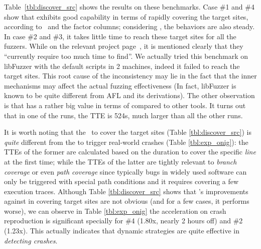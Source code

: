 Table~\ref{tbl:discover_src} shows the results on these benchmarks. 
Case \#1 and \#4 show that \dFOT exhibits good capability in terms of rapidly covering the target sites, according to {\utte}~and the factor columns; considering \alz, the behaviors are also steady. 
In case \#2 and \#3, it takes little time to reach these target sites for all the fuzzers.
While on the relevant project page~\cite{libpng-fts}, it is mentioned clearly that they ``currently require too much time to find''. 
We actually tried this benchmark on libFuzzer with the default scripts in 2 machines, indeed it failed to reach the target sites. 
This root cause of the inconsistency may lie in the fact that the inner mechanisms may affect the actual fuzzing effectiveness (In fact, libFuzzer is known to be quite different from AFL and its derivations). The other observation is that {{\dGO}} has a rather big value in terms of {\utte} compared to other tools. It turns out that in one of the runs, the TTE is 524s, much larger than all the other runs.

It is worth noting that the \utte~to cover the target sites (Table \ref{tbl:discover_src}) is \emph{quite} different from the {\utte} to trigger real-world crashes (Table \ref{tbl:exp_onig}): the TTEs of the former are calculated based on the duration to cover the specific \emph{line} at the first time; while the TTEs of the latter are tightly relevant to \emph{branch coverage} or even \emph{path coverage} since typically bugs in widely used software can only be triggered with special path conditions and it requires covering a few execution traces. Although Table \ref{tbl:discover_src} shows that \dFOT's improvements against \dGO in covering target sites are not obvious (and for a few cases, it performs worse), we can observe in Table \ref{tbl:exp_onig} the acceleration on crash reproduction is significant specially for \#4 (1.80x, nearly 2 hours off) and \#2 (1.23x). This actually indicates that dynamic strategies are quite effective in \emph{detecting crashes}.

